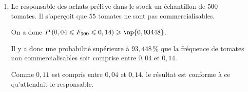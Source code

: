 \begin{enumerate}
\begin{enumerate}
$P\left (0,04 < F_n < 0,14\right ) =  1-P \left (\left | F_n-0,09 \right | \geqslant 0,05\right )$	

$P\left ( \left |F_n-0,09\strut \right | \geqslant 0,05 \right ) \leqslant \dfrac{32,76}{n}$
donc
$-P\left ( \left |F_n-0,09\strut \right | \geqslant 0,05 \right ) \geqslant -\dfrac{32,76}{n}$

donc
$1-P\left ( \left |F_n-0,09\strut \right | \geqslant 0,05 \right ) \geqslant 1 -\dfrac{32,76}{n}$
et donc
$P\left (0,04 < F_n < 0,14\right ) \geqslant 1 -\dfrac{32,76}{n}$

		\item Le responsable des achats prélève dans le stock un échantillon de $500$ tomates. Il s'aperçoit que $55$ tomates ne sont pas commercialisables.




On a donc $P\left (0,04 \leqslant F_{500} \leqslant 0,14\right ) \geqslant \np{0,93448}$.

Il y a donc une probabilité supérieure à $93,448$\,\% que la fréquence de tomates non commercialisables soit comprise entre $0,04$ et $0,14$.

Comme $0,11$ est compris  entre $0,04$ et $0,14$, le résultat est conforme à ce qu'attendait le responsable.

	\end{enumerate}
\end{enumerate}

\medskip
